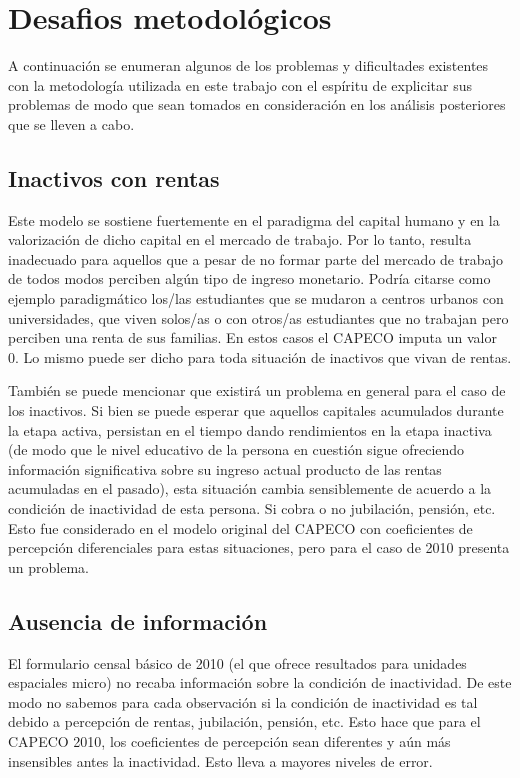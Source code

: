 	\section{Desafios metodológicos}
	
A continuación se enumeran algunos de los problemas y dificultades existentes con la metodología utilizada en este trabajo con el espíritu de explicitar sus problemas de modo que sean tomados en consideración en los análisis posteriores que se lleven a cabo.	

	\subsection{Inactivos con rentas}

Este modelo se sostiene fuertemente en el paradigma del capital humano y en la valorización de dicho capital en el mercado de trabajo. Por lo tanto, resulta inadecuado para aquellos que a pesar de no formar parte del mercado de trabajo de todos modos perciben algún tipo de ingreso monetario. Podría citarse como ejemplo paradigmático los/las estudiantes que se mudaron a centros urbanos con universidades, que viven solos/as o con otros/as estudiantes que no trabajan pero perciben una renta de sus familias. En estos casos el CAPECO imputa un valor 0. Lo mismo puede ser dicho para toda situación de inactivos que vivan de rentas. 

También se puede mencionar que existirá un problema en general para el caso de los inactivos. Si bien se puede esperar que aquellos capitales acumulados durante la etapa activa, persistan en el tiempo dando rendimientos en la etapa inactiva (de modo que le nivel educativo de la persona en cuestión sigue ofreciendo información significativa sobre su ingreso actual producto de las rentas acumuladas en el pasado), esta situación cambia sensiblemente de acuerdo a la condición de inactividad de esta persona. Si cobra o no jubilación, pensión, etc. Esto fue considerado en el modelo original del CAPECO con coeficientes de percepción diferenciales para estas situaciones, pero para el caso de 2010 presenta un problema.

	
	\subsection{Ausencia de información}
	
El formulario censal básico de 2010 (el que ofrece resultados para unidades espaciales micro) no recaba información sobre la condición de inactividad. De este modo no sabemos para cada observación si la condición de inactividad es tal debido a percepción de rentas, jubilación, pensión, etc. Esto hace que para el CAPECO 2010, los coeficientes de percepción sean diferentes y aún más insensibles antes la inactividad. Esto lleva a mayores niveles de error.
		
